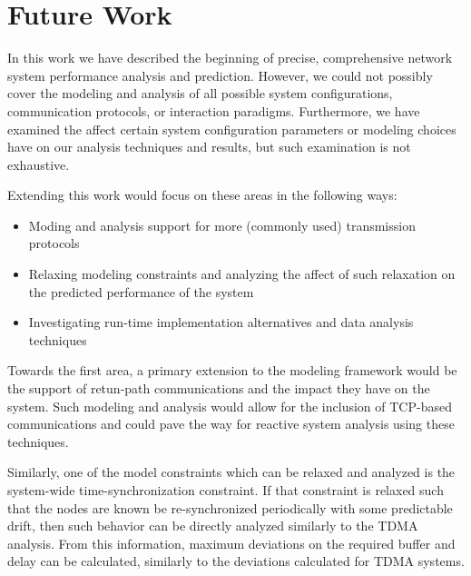 \chapter{Future Work}
\label{ch:future_work}

In this work we have described the beginning of precise, comprehensive
network system performance analysis and prediction.  However, we could
not possibly cover the modeling and analysis of all possible system
configurations, communication protocols, or interaction paradigms.
Furthermore, we have examined the affect certain system configuration
parameters or modeling choices have on our analysis techniques and
results, but such examination is not exhaustive.

Extending this work would focus on these areas in the following ways:

\begin{itemize}
  \item Moding and analysis support for more (commonly used)
    transmission protocols
  \item Relaxing modeling constraints and analyzing the affect of such
    relaxation on the predicted performance of the system
  \item Investigating run-time implementation alternatives and data
    analysis techniques
\end{itemize}

Towards the first area, a primary extension to the modeling framework
would be the support of retun-path communications and the impact they
have on the system.  Such modeling and analysis would allow for the
inclusion of TCP-based communications and could pave the way for
reactive system analysis using these techniques.  

Similarly, one of the model constraints which can be relaxed and
analyzed is the system-wide time-synchronization constraint.  If that
constraint is relaxed such that the nodes are known be re-synchronized
periodically with some predictable drift, then such behavior can be
directly analyzed similarly to the TDMA analysis.  From this
information, maximum deviations on the required buffer and delay can
be calculated, similarly to the deviations calculated for TDMA
systems.
